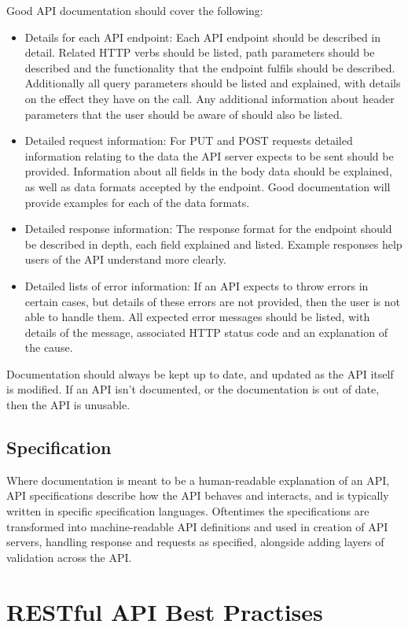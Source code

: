 Good API documentation should cover the following:
\begin{itemize}
    \item Details for each API endpoint: Each API endpoint should be described in detail. Related HTTP verbs should be listed, path parameters should be described and the functionality that the endpoint fulfils should be described. Additionally all query parameters should be listed and explained, with details on the effect they have on the call. Any additional information about header parameters that the user should be aware of should also be listed.
    \item Detailed request information: For PUT and POST requests detailed information relating to the data the API server expects to be sent should be provided. Information about all fields in the body data should be explained, as well as data formats accepted by the endpoint. Good documentation will provide examples for each of the data formats.
    \item Detailed response information: The response format for the endpoint should be described in depth, each field explained and listed. Example responses help users of the API understand more clearly. 
    \item Detailed lists of error information: If an API expects to throw errors in certain cases, but details of these errors are not provided, then the user is not able to handle them. All expected error messages should be listed, with details of the message, associated HTTP status code and an explanation of the cause. 
\end{itemize}
Documentation should always be kept up to date, and updated as the API itself is modified. If an API isn't documented, or the documentation is out of date, then the API is unusable.

\subsection{Specification}
Where documentation is meant to be a human-readable explanation of an API, API specifications describe how the API behaves and interacts, and is typically written in specific specification languages. Oftentimes the specifications are transformed into machine-readable API definitions and used in creation of API servers, handling response and requests as specified, alongside adding layers of validation across the API.

\section{RESTful API Best Practises}
